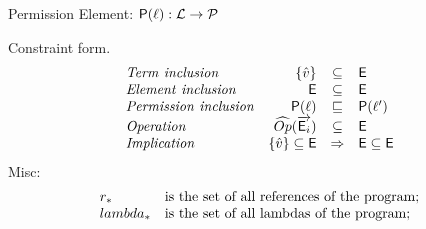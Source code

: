 \documentclass[[12pt,a4paper,twoside,openrigh]{article}
\newcommand{\vat}[0]{\hat{v}}
\begin{document}
Permission Element: $\mathsf{P}(\ell) : {\mathcal L} \rightarrow \mathcal{P} $


Constraint form.
\[
\begin{array}{lrcl}
\mathit{Term\ inclusion} & \{\vat\} & \subseteq & \El \\
\mathit{Element\ inclusion} & \El & \subseteq & \El \\
\mathit{Permission\ inclusion} & \Pel(\ell) & \sqsubseteq & \Pel(\ell') \\
\mathit{Operation} & \widehat{Op}(\vec{\El_i}) & \subseteq & \El \\
\mathit{Implication} & \{\vat\} \subseteq \El & \Rightarrow & \El \subseteq \El \\
\end{array}
\]
Misc:
\[
\begin{array}{l l}
r_* & $is the set of all references of the program;$\\
lambda_* & $is the set of all lambdas of the program;$\\
\end{array}
\]
\end{document}
